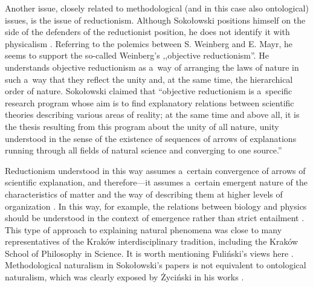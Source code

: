 \documentclass[%
  manuscript=article,
  year=2024,
  volume=77,
  doi=00000.000,
]{zfn}
\begin{document}
Another issue, closely related to methodological (and in this case also ontological) issues, is the issue of reductionism. Although Sokołowski positions himself on the side of the defenders of the reductionist position, he does not identify it with physicalism 
\parencite[][]{Sokoowski1999Maa}. %
 Referring to the polemics between S. Weinberg and E. Mayr, he seems to support the so-called Weinberg's ,,objective reductionism''. He understands objective reductionism as a~way of arranging the laws of nature in such a~way that they reflect the unity and, at the same time, the hierarchical order of nature. Sokołowski claimed that ``objective reductionism is a~specific research program whose aim is to find explanatory relations between scientific theories describing various areas of reality; at the same time and above all, it is the thesis resulting from this program about the unity of all nature, unity understood in the sense of the existence of sequences of arrows of explanations running through all fields of natural science and converging to one source.''
\parencite[][p.75]{Sokoowski1999Maa}%




Reductionism understood in this way assumes a~certain convergence of arrows of scientific explanation, and therefore---it assumes a~certain emergent nature of the characteristics of matter and the way of describing them at higher levels of organization 
\parencite[see][]{Sokoowski2006Teorie}. %
 In this way, for example, the relations between biology and physics should be understood in the context of emergence rather than strict entailment 
\parencite[][p.216]{Sokoowski2001Wspoczesne}. %
 This type of approach to explaining natural phenomena was close to many representatives of the Kraków interdisciplinary tradition, including the Kraków School of Philosophy in Science. It is worth mentioning Fuliński's views here 
\parencite[e.g.,][]{Fulinski1993O}. %
 Methodological naturalism in Sokołowski's papers is not equivalent to ontological naturalism, which was clearly exposed by Życiński in his works 
\parencite[][]{Zycinski2003Naturalizm}.%
\end{document}
